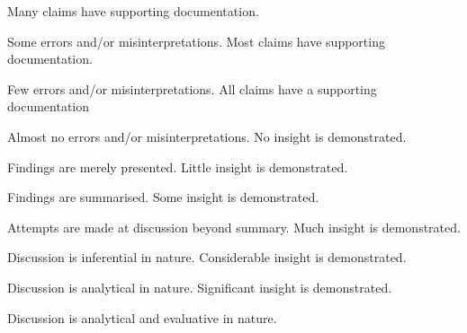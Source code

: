 \documentclass{../fal_assignment}
\begin{document}
\begin{markingrubric}
        \grade 		Many claims have supporting documentation.
        \par 		Some errors and/or misinterpretations.
        \grade 		Most claims have supporting documentation.
        \par 		Few errors and/or misinterpretations.
        \grade 		All claims have a supporting documentation
        \par 		Almost no errors and/or misinterpretations.
        	\grade\fail No insight is demonstrated.
        \par		Findings are merely presented.
        \grade		Little insight is demonstrated.
        \par		Findings are summarised.
        \grade		Some insight is demonstrated.
        \par		Attempts are made at discussion beyond summary.
        \grade		Much insight is demonstrated.
        \par		Discussion is inferential in nature.
        \grade		Considerable insight is demonstrated.
        \par		Discussion is analytical in nature.
        \grade		Significant insight is demonstrated.
        \par		Discussion is analytical and evaluative in nature.
\end{markingrubric}
\end{document}
